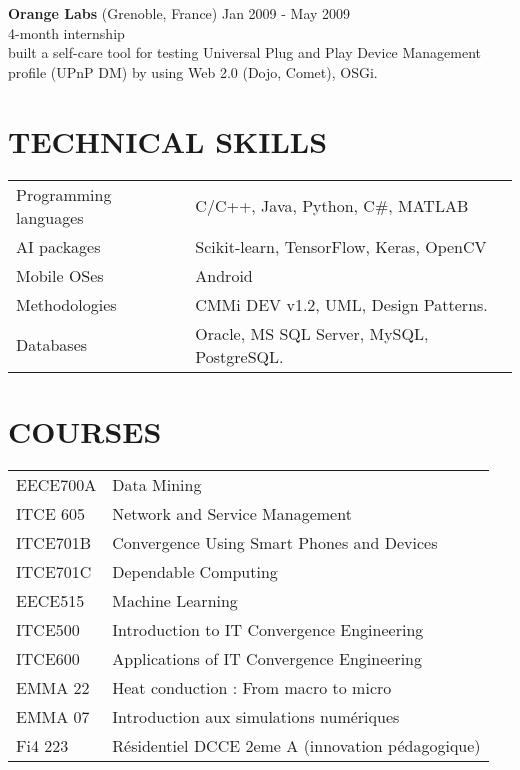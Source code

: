\documentclass[margin, 10pt]{res} %
\begin{document}
\begin{resume}
\textbf{Orange Labs} (Grenoble, France)			\hfill Jan 2009 - May 2009 \\
4-month internship \\
built a self-care tool for testing Universal Plug and Play Device Management profile (UPnP DM) by using Web 2.0 (Dojo, Comet), OSGi. \\


\section{TECHNICAL SKILLS}

\begin{table}[h]
\begin{tabular}{ll}
Programming languages & C/C++, Java, Python, C\#, MATLAB \\
AI packages & Scikit-learn, TensorFlow, Keras, OpenCV \\
Mobile OSes &	Android \\
Methodologies & CMMi DEV v1.2, UML, Design Patterns. \\
Databases &	Oracle, MS SQL Server, MySQL, PostgreSQL. \\
\end{tabular}
\end{table}

\pagebreak
\section{COURSES}
\begin{table}[h]
\begin{tabular}{ll}
EECE700A & Data Mining \\ 
ITCE 605 & Network and Service Management \\
ITCE701B & Convergence Using Smart Phones and Devices \\
ITCE701C & Dependable Computing \\
EECE515  & Machine Learning \\
ITCE500	 & Introduction to IT Convergence Engineering \\
ITCE600  & Applications of IT Convergence Engineering \\
EMMA 22  & Heat conduction : From macro to micro \\
EMMA 07  & Introduction aux simulations numériques \\
Fi4 223  & Résidentiel DCCE 2eme A (innovation pédagogique) \\
\end{tabular}
\end{table}



\end{resume}
\end{document}
